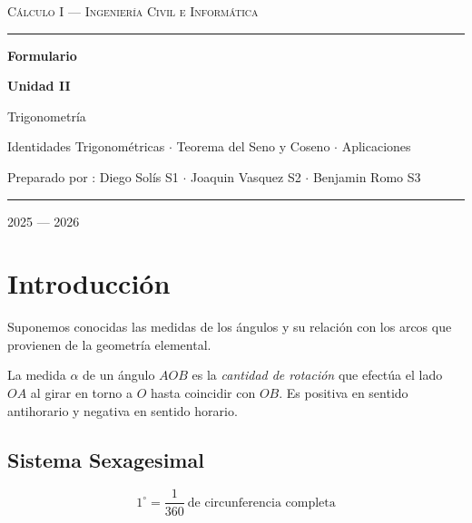 \documentclass[12pt,a4paper]{article}
\begin{document}
\begin{titlepage}
  \pagecolor{azulOscuro}
  \centering
  \vspace*{3cm}
  {\color{white}\fontsize{13}{16}\selectfont\scshape
    Cálculo I --- Ingeniería Civil e Informática\par}
  \vspace{0.4cm}
  {\color{grisBorde}\rule{0.6\linewidth}{0.4pt}\par}
  \vspace{0.8cm}
  {\color{white}\fontsize{32}{38}\selectfont\bfseries Formulario\par}
  {\color{dorado}\fontsize{28}{34}\selectfont\bfseries Unidad II\par}
  \vspace{0.5cm}
  {\color{azulClaro}\fontsize{16}{20}\selectfont Trigonometría\par}
  \vspace{0.3cm}
  {\color{grisBorde}\small
    Identidades Trigonométricas $\cdot$
    Teorema del Seno y Coseno $\cdot$ Aplicaciones\par}
  \vspace{1.2cm}
  {\color{grisBorde}\small
    Preparado por : Diego Solís S1 $\cdot$
    Joaquin Vasquez S2 $\cdot$ Benjamin Romo S3 \par}
  \vspace{1.2cm}
  {\color{grisBorde}\rule{0.4\linewidth}{0.3pt}\par}
  \vspace{0.6cm}
  {\color{white}\normalsize 2025 --- 2026\par}
  \vfill
\end{titlepage}
\nopagecolor

\tableofcontents
\newpage

\section{Introducción}

Suponemos conocidas las medidas de los ángulos y su relación con los
arcos que provienen de la geometría elemental.

La medida $\alpha$ de un ángulo $AOB$ es la \textit{cantidad de
rotación} que efectúa el lado $OA$ al girar en torno a $O$ hasta
coincidir con $OB$. Es positiva en sentido antihorario y negativa en
sentido horario.

\subsection{Sistema Sexagesimal}
\[
  1^\circ = \frac{1}{360}\ \text{de circunferencia completa}
\]
\end{document}
